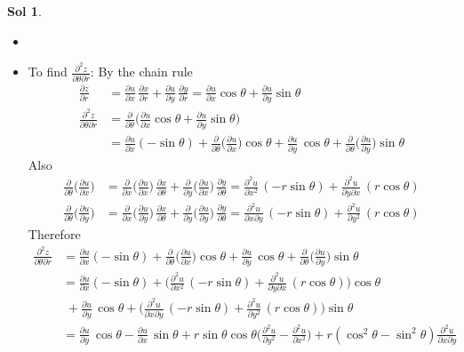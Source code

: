 \documentclass[12pt]{extarticle}
\newcommand{\ds}{\displaystyle}
\theoremstyle{definition}
\newtheorem*{sol}{Sol}
\newcommand{\pdiff}[2]{\frac{\partial #1}{\partial #2}}
\newcommand{\pdifft}[2]{\frac{\partial^2 #1}{\partial #2^2}}
\begin{document}
\begin{sol} 
  \begin{itemize}
    \item[]
    \item To find $\ds\frac{\partial^2 z}{\partial\theta\partial r}$: By the chain rule
  \begin{align*}
    \pdiff{z}{r} &= \pdiff{u}{x}\,\pdiff{x}{r} + \pdiff{u}{y}\,\pdiff{y}{r} = \pdiff{u}{x}\cos\theta + \pdiff{u}{y}\sin\theta \\
    \frac{\partial^2 z}{\partial\theta\partial r} &= \pdiff{}{\theta}\bigg(\pdiff{u}{x}\cos\theta + \pdiff{u}{y}\sin\theta\bigg) \\ &= \pdiff{u}{x}(-\sin\theta) + \pdiff{}{\theta}\bigg(\pdiff{u}{x}\bigg)\cos\theta + \pdiff{u}{y}\,\cos\theta + \pdiff{}{\theta}\bigg(\pdiff{u}{y}\bigg)\sin\theta
  \end{align*}
  Also
  \begin{align*}
    \pdiff{}{\theta}\bigg(\pdiff{u}{x}\bigg) &= \pdiff{}{x}\bigg(\pdiff{u}{x}\bigg)\,\pdiff{x}{\theta} + \pdiff{}{y}\bigg(\pdiff{u}{x}\bigg)\,\pdiff{y}{\theta} = \pdifft{u}{x}\,(-r\sin\theta) + \frac{\partial^2 u}{\partial y\partial x}\,(r\cos\theta) \\
    \pdiff{}{\theta}\bigg(\pdiff{u}{y}\bigg) &= \pdiff{}{x}\bigg(\pdiff{u}{y}\bigg)\,\pdiff{x}{\theta} + \pdiff{}{y}\bigg(\pdiff{u}{y}\bigg)\,\pdiff{y}{\theta} = \frac{\partial^2 u}{\partial x\partial y}\,(-r\sin\theta) + \pdifft{u}{y}\,(r\cos\theta)
  \end{align*}
  Therefore
  \begin{align*}
    \frac{\partial^2 z}{\partial\theta\partial r} &= \pdiff{u}{x}(-\sin\theta) + \pdiff{}{\theta}\bigg(\pdiff{u}{x}\bigg)\cos\theta + \pdiff{u}{y}\,\cos\theta + \pdiff{}{\theta}\bigg(\pdiff{u}{y}\bigg)\sin\theta \\
    &= \pdiff{u}{x}(-\sin\theta) + \bigg(\pdifft{u}{x}\,(-r\sin\theta) + \frac{\partial^2 u}{\partial y\partial x}\,(r\cos\theta)\bigg)\cos\theta \\ &\;+ \pdiff{u}{y}\,\cos\theta + \bigg(\frac{\partial^2 u}{\partial x\partial y}\,(-r\sin\theta) + \pdifft{u}{y}\,(r\cos\theta)\bigg)\sin\theta \\
    &= \pdiff{u}{y}\,\cos\theta - \pdiff{u}{x}\,\sin\theta + r\sin\theta\cos\theta\bigg(\pdifft{u}{y} - \pdifft{u}{x}\bigg) + r(\cos^2\theta - \sin^2\theta)\frac{\partial^2 u}{\partial x\partial y}
  \end{align*}
  

\end{itemize}
\end{sol}
\end{document}
